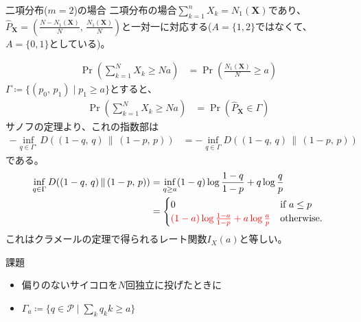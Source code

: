 \documentclass[lualatex,handout]{beamer}
\newcommand{\mycolor}[2]{%
  \begingroup
  \colorlet{currentcolor}{.}%
  \color{#1}#2%
  \color{currentcolor}%
  \endgroup
}
\newcommand{\emm}[1]{\mycolor{red}{#1}}
\newcommand\KL[2]{D(#1\,\|\,#2)}
\theoremstyle{definition}
\begin{document}
\begin{frame}{二項分布($m=2$)の場合}
\footnotesize
二項分布の場合$\sum_{k=1}^n X_k=N_1(\symbf{X})$であり、$\widehat{P}_{\symbf{X}}=\left(\frac{N-N_1(\symbf{X})}N,\,\frac{N_1(\symbf{X})}N\right)$と一対一に対応する($A=\{1,2\}$ではなくて、$A=\{0,1\}$としている)。

\begin{align*}
\Pr\left(\sum_{k=1}^N X_k \ge Na\right)
&=
\Pr\left(\frac{N_1(\symbf{X})}{N} \ge a\right)
\end{align*}
$\Gamma\coloneq \{(p_0,\,p_1)\mid p_1\ge a\}$とすると、
\begin{align*}
\Pr\left(\sum_{k=1}^N X_k \ge Na\right)
&=
\Pr\left(\widehat{P}_{\symbf{X}} \in\Gamma\right)
\end{align*}
サノフの定理より、これの指数部は
\begin{align*}
-\inf_{q\in\Gamma^\circ} \KL{(1-q,\,q)}{(1-p,\,p)}
&=-\inf_{q\in\Gamma} \KL{(1-q,\,q)}{(1-p,\,p)}
\end{align*}
である。
\begin{align*}
\inf_{q\in\Gamma} \KL{(1-q,\,q)}{(1-p,\,p)}&= \inf_{q\ge a} (1-q)\log\frac{1-q}{1-p} + q\log\frac{q}{p}\\
&= 
\begin{cases}
0&\text{if } a\le p\\
\emm{(1-a)\log\frac{1-a}{1-p} + a\log\frac{a}{p}}& \text{otherwise.}
\end{cases}
\end{align*}
これはクラメールの定理で得られるレート関数$I_X(a)$と等しい。
\end{frame}

\begin{frame}{課題}
\begin{itemize}
\item 偏りのないサイコロを$N$回独立に投げたときに
\item $\Gamma_a\coloneq\{q\in\mathcal{P}\mid \sum_k q_k k \ge a\}$
\end{itemize}
\end{frame}
\end{document}
